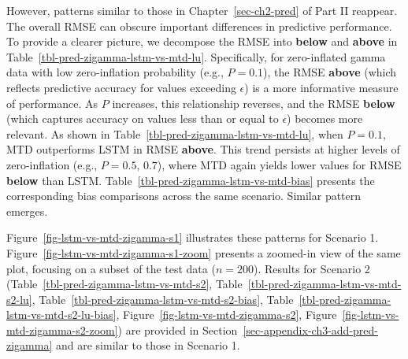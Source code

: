 \documentclass[
  letterpaper,
  double,
  12pt,
  1.0in]{beavtex}
\begin{document}
However, patterns similar to those in Chapter~\ref{sec-ch2-pred} of Part
II reappear. The overall RMSE can obscure important differences in
predictive performance. To provide a clearer picture, we decompose the
RMSE into \textbf{below} and \textbf{above} in
Table~\ref{tbl-pred-zigamma-lstm-vs-mtd-lu}. Specifically, for
zero-inflated gamma data with low zero-inflation probability (e.g.,
\(P = 0.1\)), the RMSE \textbf{above} (which reflects predictive
accuracy for values exceeding \(\epsilon\)) is a more informative
measure of performance. As \(P\) increases, this relationship reverses,
and the RMSE \textbf{below} (which captures accuracy on values less than
or equal to \(\epsilon\)) becomes more relevant. As shown in
Table~\ref{tbl-pred-zigamma-lstm-vs-mtd-lu}, when \(P = 0.1\), MTD
outperforms LSTM in RMSE \textbf{above}. This trend persists at higher
levels of zero-inflation (e.g., \(P = 0.5\), \(0.7\)), where MTD again
yields lower values for RMSE \textbf{below} than LSTM.
Table~\ref{tbl-pred-zigamma-lstm-vs-mtd-bias} presents the corresponding
bias comparisons across the same scenario. Similar pattern emerges.

Figure~\ref{fig-lstm-vs-mtd-zigamma-s1} illustrates these patterns for
Scenario 1. Figure~\ref{fig-lstm-vs-mtd-zigamma-s1-zoom} presents a
zoomed-in view of the same plot, focusing on a subset of the test data
(\(n = 200\)). Results for Scenario 2
(Table~\ref{tbl-pred-zigamma-lstm-vs-mtd-s2},
Table~\ref{tbl-pred-zigamma-lstm-vs-mtd-s2-lu},
Table~\ref{tbl-pred-zigamma-lstm-vs-mtd-s2-bias},
Table~\ref{tbl-pred-zigamma-lstm-vs-mtd-s2-lu-bias},
Figure~\ref{fig-lstm-vs-mtd-zigamma-s2},
Figure~\ref{fig-lstm-vs-mtd-zigamma-s2-zoom}) are provided in
Section~\ref{sec-appendix-ch3-add-pred-zigamma} and are similar to those
in Scenario 1.

\begin{table}

\caption{\label{tbl-pred-zigamma-lstm-vs-mtd}RMSE Comparison of LSTM and MTD for ZIGamma Scenarios 1. Each row label indicates the combination of $P$ (zero-inflated probability) and $\epsilon$ (threshold value) used in the simulation.}


\end{table}%
\end{document}
